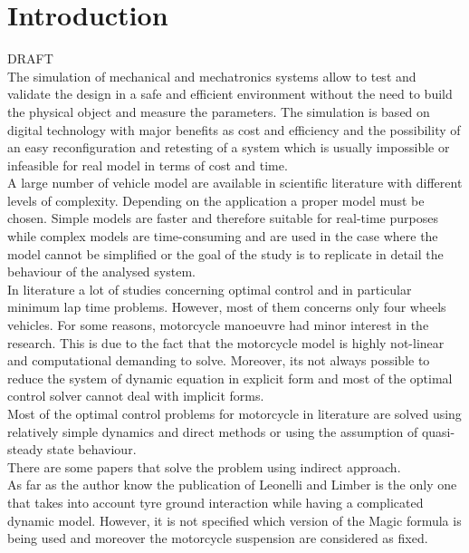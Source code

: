 \chapter*{Introduction}
%
DRAFT\\
%
The simulation of mechanical and mechatronics systems allow to test and validate the design in a safe and efficient environment without the need to build the physical object and measure the parameters. The simulation is based on digital technology with major benefits as cost and efficiency and the possibility of an easy reconfiguration and retesting of a system which is usually impossible or infeasible for real model in terms of cost and time.\cite{maria1997introduction}\\
A large number of vehicle model are available in scientific literature with different levels of complexity. Depending on the application a proper model must be chosen. Simple models are faster and therefore suitable for real-time purposes while complex models are time-consuming and are used in the case where the model cannot be simplified or the goal of the study is to replicate in detail the behaviour of the analysed system.\\
%
In literature a lot of studies concerning optimal control and in particular minimum lap time problems. However, most of them concerns only four wheels vehicles. For some reasons, motorcycle manoeuvre had minor interest in the research. This is due to the fact that the motorcycle model is highly not-linear and computational demanding to solve. Moreover, its not always possible to reduce the system of dynamic equation in explicit form and most of the optimal control solver cannot deal with implicit forms.\\
Most of the optimal control problems for motorcycle in literature are solved using relatively simple dynamics and direct methods\cite{sharp2014method,leonelli2019optimal} or using the assumption of quasi-steady state behaviour.\cite{cossalter1999general,simon2008application}\\
There are some papers that solve the problem using indirect approach\cite{bertolazzi2006symbolic}.\\ 
As far as the author know the publication of Leonelli and Limber\cite{leonelli2019optimal} is the only one that takes into account tyre ground interaction while having a complicated dynamic model. However, it is not specified which version of the Magic formula is being used and moreover the motorcycle suspension are considered as fixed.\\   
